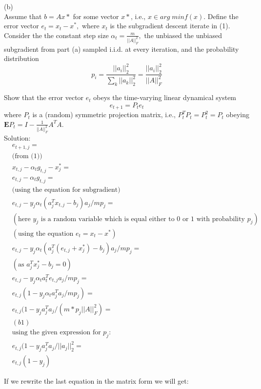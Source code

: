 \documentclass{article}
\begin{document}
(b) \\
Assume that $b = Ax*$ for some vector $x*$, i.e., 
$x \in arg \; min f(x).$ Define the error vector 
$e_t = x_t - x^*,$ where $x_t$ is the subgradient descent iterate in (1). Consider the the constant step size 
$\alpha_t = \frac{m}{||A||_F^2},$ the unbiased the unbiased subgradient from part
(a) sampled i.i.d. at every iteration, and the probability distribution
$$
p_i = \frac{||a_i||_2^2}{\sum_k ||a_k||_2^2} = \frac{||a_i||_2^2}{||A||_F^2}
$$

Show that the error vector $e_t$ obeys the time-varying linear dynamical system
$$
e_{t+1} = P_t e_t
$$
where $P_t$ is a (random) symmetric projection matrix, i.e., $P_t^T P_t = P_t^2 = P_t$ obeying 
$\mathbf{E}P_t = I - \frac{1}{||A||_F^2} A^T A.$\\

Solution: \\

\begin{align*}
& e_{t+1, j} = \\
& \text{(from (1))}\\
&x_{t,j} - \alpha_t g_{t,j} - x_j^* = \\
& e_{t, j} - \alpha_t g_{t,j} = \\
& \text{(using the equation for subgradient)}\\
& e_{t, j} - y_j \alpha_t (a_j^T x_{t,j} - b_j) a_j / mp_j = \\
& (\text{here } y_j \text{ is a random variable which is 
	equal either to 0 or 1 with probability } p_j)\\
& (\text{using the equation } e_t = x_t - x^*) \\
& e_{t, j} - y_j \alpha_t (a_j^T (e_{t,j} + x^*_j) - b_j) a_j / mp_j = \\
& (\text{as } a_j^T x^*_j - b_j = 0)\\
& e_{t, j} - y_j \alpha_t a_t^T e_{t, j} a_j / mp_j = \\
& e_{t, j}(1 - y_j \alpha_t a^T_j a_j / mp_j) = \\
& e_{t, j}(1 - y_j a^T_j a_j / (m * p_j ||A||_F^2) = \; \\ 
&(b1) \\
& \text{using the given expression for } p_j:\\
& e_{t, j}(1 - y_j a^T_j a_j / ||a_j||_2^2 = \\
&e_{t, j}(1 - y_j)
\end{align*}

If we rewrite the last equation in the matrix form 
we will get:
\end{document}
